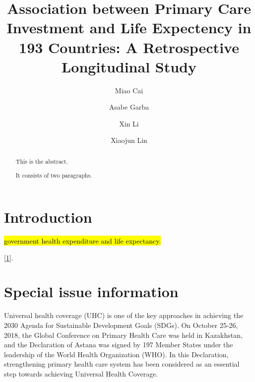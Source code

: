 \documentclass[]{elsarticle} %
\begin{document}
\begin{frontmatter}

  \title{Association between Primary Care Investment and Life Expectency in 193 Countries: A Retrospective Longitudinal Study}
    \author[SLU]{Miao Cai}
  
    \author[SLU]{Asabe Garba}
  
    \author[WHU]{Xin Li}
  
    \author[SCU]{Xiaojun Lin}
      \address[SLU]{Saint Louis University, Saint Louis, MO, 63108}
    \address[SCU]{Sichuan University, Chengdu, Sichuan, China}
    \address[WHU]{Wuhan University, Wuhan, Hubei, China}
  
  \begin{abstract}
  This is the abstract.
  
  It consists of two paragraphs.
  \end{abstract}
  
 \end{frontmatter}

\newcommand{\blandscape}{\begin{landscape}}
\newcommand{\elandscape}{\end{landscape}}
\doublespacing

\hypertarget{introduction}{%
\section{Introduction}\label{introduction}}

\hl{government health expenditure and life expectancy.}

{[}\protect\hyperlink{ref-wagstaff2018progress}{1}{]}.

\hypertarget{special-issue-information}{%
\section{Special issue information}\label{special-issue-information}}

Universal health coverage (UHC) is one of the key approaches in achieving the 2030 Agenda for Sustainable Development Goals (SDGs). On October 25-26, 2018, the Global Conference on Primary Health Care was held in Kazakhstan, and the Declaration of Astana was signed by 197 Member States under the leadership of the World Health Organization (WHO). In this Declaration, strengthening primary health care system has been considered as an essential step towards achieving Universal Health Coverage.
\end{document}
